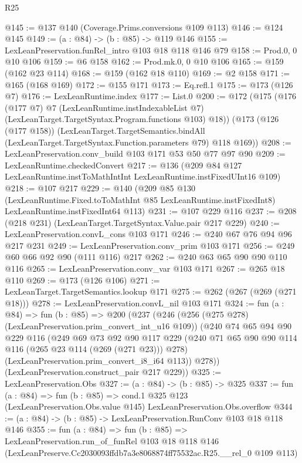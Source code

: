 \begin{lexlean}{R25}
\begin{coremodule}
@145 := @137 @140 (Coverage.Prims.conversions @109 @113)
@146 := @124 @145
@149 := (a : @84) -> (b : @85) -> @119 @146
@155 := LexLeanPreservation.funRel_intro @103 @18 @118 @146 @79
@158 := Prod.{0, 0} @10 @106
@159 := @6 @158
@162 := Prod.mk.{0, 0} @10 @106
@165 := @159 (@162 @23 @114)
@168 := @159 (@162 @18 @110)
@169 := @2 @158
@171 := @165 (@168 @169)
@172 := @155 @171
@173 := Eq.refl.{1}
@175 := @173 (@126 @7)
@176 := LexLeanRuntime.index
@177 := List.{0}
@200 := @172
    (@175
      (@176
        (@177 @7)
        @7
        (LexLeanRuntime.instIndexableList @7)
        (LexLeanTarget.TargetSyntax.Program.functions @103)
        @18))
    (@173
      (@126 (@177 @158))
      (LexLeanTarget.TargetSemantics.bindAll
        (LexLeanTarget.TargetSyntax.Function.parameters @79)
        @118
        @169))
@208 := LexLeanPreservation.conv_build @103 @171 @53 @50 @77 @97 @90
@209 := LexLeanRuntime.checkedConvert
@217 := @136 (@209 @84 @127 LexLeanRuntime.instToMathIntInt LexLeanRuntime.instFixedUInt16 @109)
@218 := @107 @217
@229 := @140
    (@209
      @85
      @130
      (LexLeanRuntime.Fixed.toToMathInt @85 LexLeanRuntime.instFixedInt8)
      LexLeanRuntime.instFixedInt64
      @113)
@231 := @107 @229 @116
@237 := @208 (@218 @231) (LexLeanTarget.TargetSyntax.Value.pair @217 @229)
@240 := LexLeanPreservation.convL_cons @103 @171
@246 := @240 @67 @76 @94 @96 @217 @231
@249 := LexLeanPreservation.conv_prim @103 @171
@256 := @249 @60 @66 @92 @90 (@111 @116) @217
@262 := @240 @63 @65 @90 @90 @110 @116
@265 := LexLeanPreservation.conv_var @103 @171
@267 := @265 @18 @110
@269 := @173 (@126 @106)
@271 := LexLeanTarget.TargetSemantics.lookup @171
@275 := @262 (@267 (@269 (@271 @18)))
@278 := LexLeanPreservation.convL_nil @103 @171
@324 := fun (a : @84) =>
  fun (b : @85) =>
  @200
    (@237
      (@246
        (@256 (@275 @278) (LexLeanPreservation.prim_convert_int_u16 @109))
        (@240
          @74
          @65
          @94
          @90
          @229
          @116
          (@249
            @69
            @73
            @92
            @90
            @117
            @229
            (@240 @71 @65 @90 @90 @114 @116 (@265 @23 @114 (@269 (@271 @23))) @278)
            (LexLeanPreservation.prim_convert_i8_i64 @113))
          @278))
      (LexLeanPreservation.construct_pair @217 @229))
@325 := LexLeanPreservation.Obs
@327 := (a : @84) -> (b : @85) -> @325
@337 := fun (a : @84) =>
  fun (b : @85) =>
  cond.{1} @325 @123 (LexLeanPreservation.Obs.value @145) LexLeanPreservation.Obs.overflow
@344 := (a : @84) -> (b : @85) -> LexLeanPreservation.RunConv @103 @18 @118 @146
@355 := fun (a : @84) =>
  fun (b : @85) =>
  LexLeanPreservation.run_of_funRel
    @103
    @18
    @118
    @146
    (LexLeanPreserve.Cc2030093ffdb7a3e8068874ff75532ac.R25.__rel_0 @109 @113)
\end{coremodule}
\end{lexlean}
